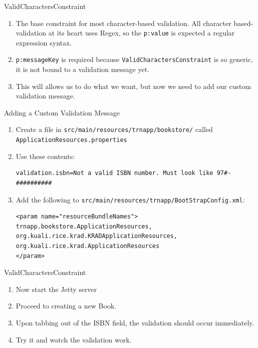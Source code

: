 \documentclass[xcolor=dvipsnames,14pt,professionalfonts]{beamer}
\begin{document}
\begin{frame}{ValidCharactersConstraint}
  \begin{enumerate}
    \item The base constraint for most character-based validation. All
      character based-validation at its heart uses Regex, so the
      \texttt{p:value} is expected a regular expression syntax.
    \item \texttt{p:messageKey} is required because
      \texttt{ValidCharactersConstraint} is so generic, it is not
      bound to a validation message yet.
    \item This will allows us to do what we want, but now we need to
      add our custom validation message.
  \end{enumerate}
\end{frame}

\begin{frame}[fragile]{Adding a Custom Validation Message}
  \begin{enumerate}
    \item Create a file in
      \texttt{src/main/resources/trnapp/bookstore/} called
      \texttt{ApplicationResources.properties}
    \item Use these contents:
    \begin{verbatim}
validation.isbn=Not a valid ISBN number. Must look like 97#-##########
    \end{verbatim}
    \item Add the following to
      \texttt{src/main/resources/trnapp/BootStrapConfig.xml}:
    \begin{verbatim}
<param name="resourceBundleNames">
trnapp.bookstore.ApplicationResources,
org.kuali.rice.krad.KRADApplicationResources,
org.kuali.rice.krad.ApplicationResources
</param>
    \end{verbatim}
  \end{enumerate}
    
\end{frame}

\begin{frame}{ValidCharactersConstraint}
  \begin{enumerate}
    \item Now start the Jetty server
    \item Proceed to creating a new Book.
    \item Upon tabbing out of the ISBN field, the validation should
      occur immediately. 
    \item Try it and watch the validation work.
  \end{enumerate}
\end{frame}
\end{document}
